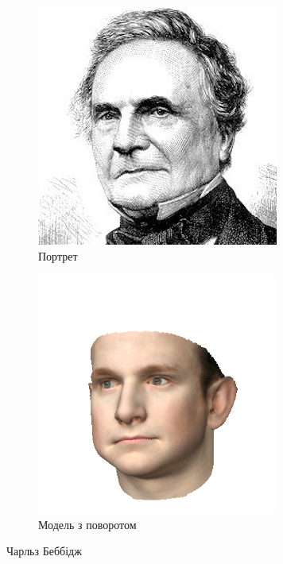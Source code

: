 \begin{figure}[h]
  \centering
  \begin{subfigure}[b]{0.4\textwidth}
    \centering
    \includegraphics[width=\textwidth]{images/babbage-old}
    \caption{Портрет}
    \label{fig:practice:babbage-old}
  \end{subfigure}
  \begin{subfigure}[b]{0.4\textwidth}
    \centering
    \includegraphics[width=\textwidth]{images/babbage-model-rotated}
    \caption{Модель з поворотом}
    \label{fig:practice:babbage-model-rotated}
  \end{subfigure}
  \caption{Чарльз Беббідж}
\end{figure}

